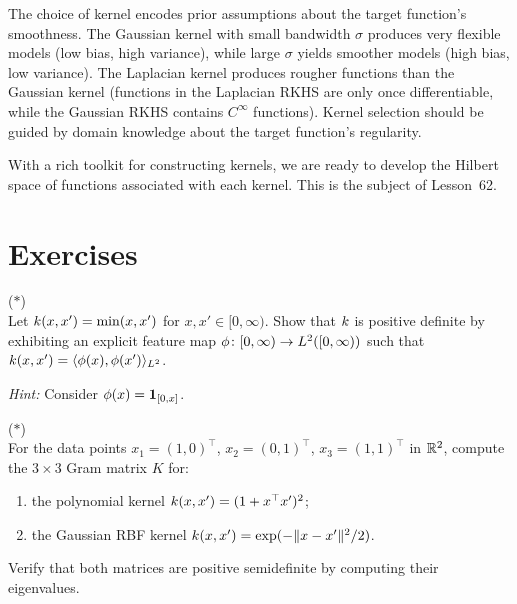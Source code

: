 \documentclass[11pt,a4paper]{article}
\begin{document}
\begin{warning}[title={Kernel Selection Matters}]
The choice of kernel encodes prior assumptions about the target
function's smoothness. The Gaussian kernel with small bandwidth
$\sigma$ produces very flexible models (low bias, high variance),
while large $\sigma$ yields smoother models (high bias, low
variance). The Laplacian kernel produces rougher functions than
the Gaussian kernel (functions in the Laplacian RKHS are only
once differentiable, while the Gaussian RKHS contains
$C^\infty$ functions). Kernel selection should be guided by
domain knowledge about the target function's regularity.
\end{warning}

With a rich toolkit for constructing kernels, we are ready to
develop the Hilbert space of functions associated with each kernel.
This is the subject of Lesson~62.


\section{Exercises}
\label{sec:exercises}

\begin{exercise}
\textnormal{(\(*\))} \\
Let $k(x, x') = \min(x, x')$ for $x, x' \in [0, \infty)$.
Show that $k$ is positive definite by exhibiting an explicit
feature map $\phi \colon [0, \infty) \to L^2([0, \infty))$
such that $k(x, x') = \langle \phi(x), \phi(x')
\rangle_{L^2}$.

\textit{Hint:} Consider $\phi(x) = \mathbf{1}_{[0,x]}$.
\end{exercise}

\begin{exercise}
\textnormal{(\(*\))} \\
For the data points $x_1 = (1, 0)^\top$, $x_2 = (0, 1)^\top$,
$x_3 = (1, 1)^\top$ in $\mathbb{R}^2$, compute the $3 \times 3$ Gram
matrix $K$ for:
\begin{enumerate}[label=(\alph*)]
    \item the polynomial kernel $k(x, x') = (1 + x^\top x')^2$;
    \item the Gaussian RBF kernel $k(x, x') = \exp(-\|x - x'\|^2 / 2)$.
\end{enumerate}
Verify that both matrices are positive semidefinite by computing
their eigenvalues.
\end{exercise}
\end{document}
